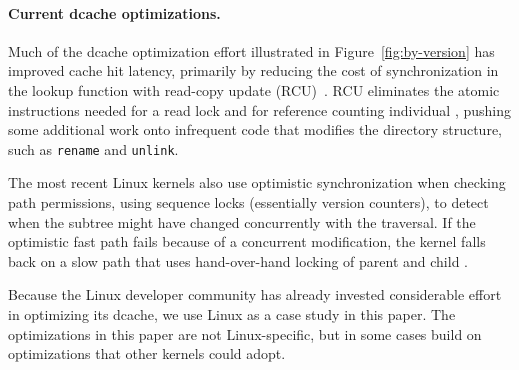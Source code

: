 \paragraph{Current dcache optimizations.}
Much of the dcache optimization effort illustrated in Figure~\ref{fig:by-version}
has improved cache hit latency, primarily by reducing the cost of
synchronization in the lookup function with read-copy update (RCU)~\citep{mckenney04rcu,dcachercu04}.
RCU eliminates the atomic instructions needed for a read lock and for reference counting individual \dentries{},
pushing some additional work onto infrequent code that modifies the directory structure,
such as {\tt rename} and {\tt unlink}.

The most recent Linux kernels also use optimistic synchronization when checking
path permissions, using sequence locks (essentially version counters), 
to detect when the subtree might have changed concurrently with the traversal.
If the optimistic fast path fails because of a concurrent modification, 
the kernel falls back on a slow path that uses
hand-over-hand locking of parent and child \dentries{}.

Because the Linux developer community has already invested considerable effort 
in optimizing its dcache, we use Linux as a case study in this paper.
The optimizations in this paper are not Linux-specific,
but in some cases build on optimizations that other kernels could adopt. 



